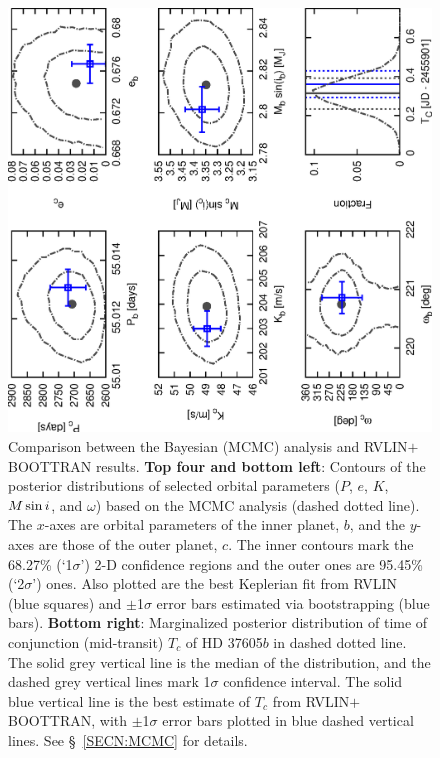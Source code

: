 \begin{figure}
\center
\includegraphics[angle=270,scale=0.4]{37605/f3.eps}
\caption{Comparison between the Bayesian (MCMC) analysis and RVLIN$+$BOOTTRAN
  results.
%
  {\bf Top four and bottom left}: Contours of the posterior
  distributions of selected orbital parameters ($P$, $e$, $K$,
  $M\sin{i}$, and $\omega$) based on the MCMC analysis (dashed dotted
  line). The $x$-axes are orbital parameters of the inner planet, $b$,
  and the $y$-axes are those of the outer planet, $c$. The inner
  contours mark the 68.27\% (`1$\sigma$') 2-D confidence regions and
  the outer ones are 95.45\% (`2$\sigma$') ones. Also plotted are the
  best Keplerian fit from RVLIN (blue squares) and $\pm$1$\sigma$
  error bars estimated via bootstrapping (blue bars).
%
  {\bf Bottom right}: Marginalized posterior distribution of time of
  conjunction (mid-transit) $T_c$ of HD 37605$b$ in dashed dotted
  line. The solid grey vertical line is the median of the
  distribution, and the dashed grey vertical lines mark 1$\sigma$
  confidence interval. The solid blue vertical line is the best
  estimate of $T_c$ from RVLIN$+$BOOTTRAN, with $\pm$1$\sigma$ error
  bars plotted in blue dashed vertical lines.
%
  See \S~\ref{SECN:MCMC} for details.
\label{mcmcplot}}
\end{figure}



